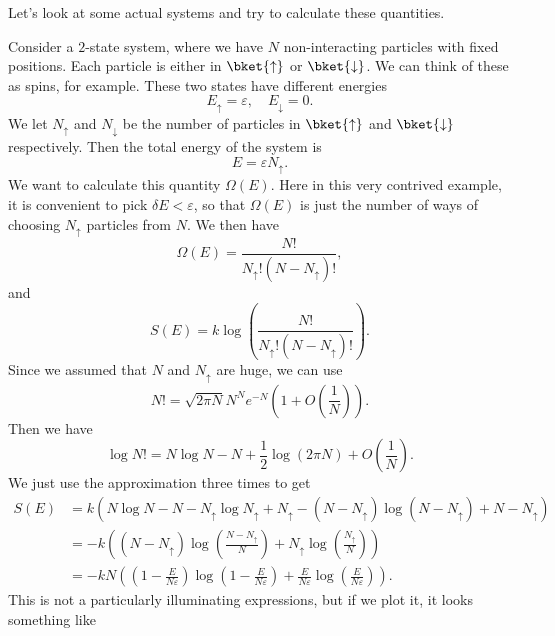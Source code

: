 \documentclass[a4paper]{article}
\begin{document}
Let's look at some actual systems and try to calculate these quantities.
\begin{eg}
  Consider a $2$-state system, where we have $N$ non-interacting particles with fixed positions. Each particle is either in $\bket{\uparrow}$ or $\bket{\downarrow}$. We can think of these as spins, for example. These two states have different energies
  \[
    E_{\uparrow} = \varepsilon,\quad E_{\downarrow} = 0.
  \]
  We let $N_{\uparrow}$ and $N_{\downarrow}$ be the number of particles in $\bket{\uparrow}$ and $\bket{\downarrow}$ respectively. Then the total energy of the system is
  \[
    E = \varepsilon N_{\uparrow}.
  \]
  We want to calculate this quantity $\Omega(E)$. Here in this very contrived example, it is convenient to pick $\delta E < \varepsilon$, so that $\Omega(E)$ is just the number of ways of choosing $N_{\uparrow}$ particles from $N$. We then have
  \[
    \Omega(E) = \frac{N!}{N_{\uparrow}! (N - N_\uparrow)!},
  \]
  and
  \[
    S(E) = k \log \left(\frac{N!}{N_{\uparrow}! (N - N_\uparrow)!}\right).
  \]
  Since we assumed that $N$ and $N_\uparrow$ are huge, we can use 
  \[
    N! = \sqrt{2\pi N} N^N e^{-N} \left(1 + O\left(\frac{1}{N}\right)\right).
  \]
  Then we have
  \[
    \log N! = N \log N - N + \frac{1}{2}\log (2\pi N) + O\left(\frac{1}{N}\right).
  \]
  We just use the approximation three times to get
  \begin{align*}
    S(E) &= k\left(N \log N - N - N_\uparrow \log N_\uparrow + N_\uparrow - (N - N_\uparrow) \log(N - N_\uparrow) + N - N_\uparrow\right)\\
    &= -k \left((N - N_\uparrow) \log \left(\frac{N - N_\uparrow}{N}\right) + N_\uparrow \log\left(\frac{N_{\uparrow}}{N}\right)\right)\\
    &= -kN\left(\left(1 - \frac{E}{N\varepsilon}\right) \log\left(1 - \frac{E}{N\varepsilon}\right) + \frac{E}{N\varepsilon} \log\left(\frac{E}{N\varepsilon}\right)\right).
  \end{align*}
  This is not a particularly illuminating expressions, but if we plot it, it looks something like
  \begin{center}
\end{center}
\end{eg}
\end{document}
